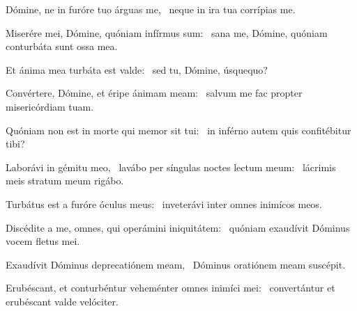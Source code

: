 \item Dómine, ne in furóre tuo árguas me,~\psstar{} neque in ira tua corrípias me.

\item Miserére mei, Dómine, quóniam infírmus sum:~\psstar{} sana me, Dómine, quóniam conturbáta sunt ossa mea.

\item Et ánima mea turbáta est valde:~\psstar{} sed tu, Dómine, úsquequo?

\item Convértere, Dómine, et éripe ánimam meam:~\psstar{} salvum me fac propter misericórdiam tuam.

\item Quóniam non est in morte qui memor sit tui:~\psstar{} in inférno autem quis confitébitur tibi?

\item Laborávi in gémitu meo,~\pscross{} lavábo per síngulas noctes lectum meum:~\psstar{} lácrimis meis stratum meum rigábo.

\item Turbátus est a furóre óculus meus:~\psstar{} inveterávi inter omnes inimícos meos.

\item Discédite a me, omnes, qui operámini iniquitátem:~\psstar{} quóniam exaudívit Dóminus vocem fletus mei.

\item Exaudívit Dóminus deprecatiónem meam,~\psstar{} Dóminus oratiónem meam suscépit.

\item Erubéscant, et conturbéntur veheménter omnes inimíci mei:~\psstar{} convertántur et erubéscant valde velóciter.

